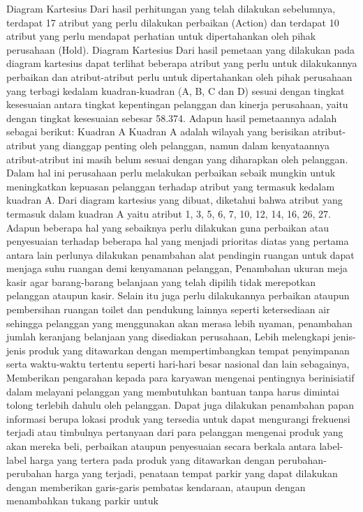 Diagram Kartesius
Dari hasil perhitungan yang telah dilakukan sebelumnya, terdapat 17 atribut yang perlu dilakukan perbaikan (Action) dan terdapat 10 atribut yang perlu mendapat
perhatian untuk dipertahankan oleh pihak perusahaan (Hold). Diagram Kartesius Dari hasil pemetaan yang dilakukan pada diagram kartesius dapat terlihat beberapa
atribut yang perlu untuk dilakukannya perbaikan dan atribut-atribut perlu untuk dipertahankan oleh pihak perusahaan yang terbagi kedalam kuadran-kuadran (A, B, C
dan D) sesuai dengan tingkat kesesuaian antara tingkat kepentingan pelanggan dan kinerja perusahaan, yaitu dengan tingkat kesesuaian sebesar 58.374.
Adapun hasil pemetaannya adalah sebagai berikut:
Kuadran A
Kuadran A adalah wilayah yang berisikan atribut-atribut yang dianggap penting oleh pelanggan, namun dalam kenyataannya atribut-atribut ini masih belum sesuai
dengan yang diharapkan oleh pelanggan. Dalam hal ini perusahaan perlu melakukan perbaikan sebaik mungkin untuk meningkatkan kepuasan pelanggan terhadap
atribut yang termasuk kedalam kuadran A. Dari diagram kartesius yang dibuat, diketahui bahwa atribut yang termasuk dalam kuadran A yaitu atribut 1, 3, 5, 6, 7,
10, 12, 14, 16, 26, 27.
Adapun beberapa hal yang sebaiknya perlu dilakukan guna perbaikan atau penyesuaian terhadap beberapa hal yang menjadi prioritas diatas yang pertama antara lain
perlunya dilakukan penambahan alat pendingin ruangan untuk dapat menjaga suhu ruangan demi kenyamanan pelanggan, Penambahan ukuran meja kasir agar barang-barang belanjaan yang telah dipilih
tidak merepotkan pelanggan ataupun kasir. Selain itu juga perlu dilakukannya perbaikan ataupun pembersihan ruangan toilet dan pendukung lainnya seperti ketersediaan air
sehingga pelanggan yang menggunakan akan merasa lebih nyaman, penambahan jumlah keranjang belanjaan yang disediakan perusahaan, Lebih melengkapi jenis-jenis
produk yang ditawarkan dengan mempertimbangkan tempat penyimpanan serta waktu-waktu tertentu seperti hari-hari besar nasional dan lain sebagainya, Memberikan pengarahan kepada para
karyawan mengenai pentingnya berinisiatif dalam melayani pelanggan yang membutuhkan bantuan tanpa harus dimintai tolong terlebih dahulu oleh pelanggan.
Dapat juga dilakukan penambahan papan informasi berupa lokasi produk yang tersedia untuk dapat mengurangi frekuensi terjadi atau timbulnya pertanyaan dari para
pelanggan mengenai produk yang akan mereka beli, perbaikan ataupun penyesuaian secara berkala antara label-label harga yang tertera pada produk yang ditawarkan dengan perubahan-perubahan
harga yang terjadi, penataan tempat parkir yang dapat dilakukan dengan memberikan garis-garis pembatas kendaraan, ataupun dengan menambahkan tukang parkir untuk
